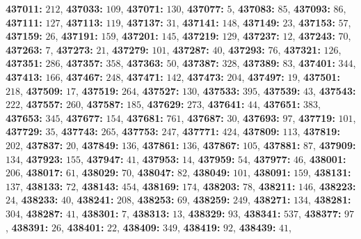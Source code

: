 \textsf{\bfseries 437011:} $212$, \textsf{\bfseries 437033:} $109$, \textsf{\bfseries 437071:} $130$, \textsf{\bfseries 437077:} $5$, \textsf{\bfseries 437083:} $85$, \textsf{\bfseries 437093:} $86$, \textsf{\bfseries 437111:} $127$, \textsf{\bfseries 437113:} $119$, \textsf{\bfseries 437137:} $31$, \textsf{\bfseries 437141:} $148$, \textsf{\bfseries 437149:} $23$, \textsf{\bfseries 437153:} $57$, \textsf{\bfseries 437159:} $26$, \textsf{\bfseries 437191:} $159$, \textsf{\bfseries 437201:} $145$, \textsf{\bfseries 437219:} $129$, \textsf{\bfseries 437237:} $12$, \textsf{\bfseries 437243:} $70$, \textsf{\bfseries 437263:} $7$, \textsf{\bfseries 437273:} $21$, \textsf{\bfseries 437279:} $101$, \textsf{\bfseries 437287:} $40$, \textsf{\bfseries 437293:} $76$, \textsf{\bfseries 437321:} $126$, \textsf{\bfseries 437351:} $286$, \textsf{\bfseries 437357:} $358$, \textsf{\bfseries 437363:} $50$, \textsf{\bfseries 437387:} $328$, \textsf{\bfseries 437389:} $83$, \textsf{\bfseries 437401:} $344$, \textsf{\bfseries 437413:} $166$, \textsf{\bfseries 437467:} $248$, \textsf{\bfseries 437471:} $142$, \textsf{\bfseries 437473:} $204$, \textsf{\bfseries 437497:} $19$, \textsf{\bfseries 437501:} $218$, \textsf{\bfseries 437509:} $17$, \textsf{\bfseries 437519:} $264$, \textsf{\bfseries 437527:} $130$, \textsf{\bfseries 437533:} $395$, \textsf{\bfseries 437539:} $43$, \textsf{\bfseries 437543:} $222$, \textsf{\bfseries 437557:} $260$, \textsf{\bfseries 437587:} $185$, \textsf{\bfseries 437629:} $273$, \textsf{\bfseries 437641:} $44$, \textsf{\bfseries 437651:} $383$, \textsf{\bfseries 437653:} $345$, \textsf{\bfseries 437677:} $154$, \textsf{\bfseries 437681:} $761$, \textsf{\bfseries 437687:} $30$, \textsf{\bfseries 437693:} $97$, \textsf{\bfseries 437719:} $101$, \textsf{\bfseries 437729:} $35$, \textsf{\bfseries 437743:} $265$, \textsf{\bfseries 437753:} $247$, \textsf{\bfseries 437771:} $424$, \textsf{\bfseries 437809:} $113$, \textsf{\bfseries 437819:} $202$, \textsf{\bfseries 437837:} $20$, \textsf{\bfseries 437849:} $136$, \textsf{\bfseries 437861:} $136$, \textsf{\bfseries 437867:} $105$, \textsf{\bfseries 437881:} $87$, \textsf{\bfseries 437909:} $134$, \textsf{\bfseries 437923:} $155$, \textsf{\bfseries 437947:} $41$, \textsf{\bfseries 437953:} $14$, \textsf{\bfseries 437959:} $54$, \textsf{\bfseries 437977:} $46$, \textsf{\bfseries 438001:} $206$, \textsf{\bfseries 438017:} $61$, \textsf{\bfseries 438029:} $70$, \textsf{\bfseries 438047:} $82$, \textsf{\bfseries 438049:} $101$, \textsf{\bfseries 438091:} $159$, \textsf{\bfseries 438131:} $137$, \textsf{\bfseries 438133:} $72$, \textsf{\bfseries 438143:} $454$, \textsf{\bfseries 438169:} $174$, \textsf{\bfseries 438203:} $78$, \textsf{\bfseries 438211:} $146$, \textsf{\bfseries 438223:} $24$, \textsf{\bfseries 438233:} $40$, \textsf{\bfseries 438241:} $208$, \textsf{\bfseries 438253:} $69$, \textsf{\bfseries 438259:} $249$, \textsf{\bfseries 438271:} $134$, \textsf{\bfseries 438281:} $304$, \textsf{\bfseries 438287:} $41$, \textsf{\bfseries 438301:} $7$, \textsf{\bfseries 438313:} $13$, \textsf{\bfseries 438329:} $93$, \textsf{\bfseries 438341:} $537$, \textsf{\bfseries 438377:} $97$, \textsf{\bfseries 438391:} $26$, \textsf{\bfseries 438401:} $22$, \textsf{\bfseries 438409:} $349$, \textsf{\bfseries 438419:} $92$, \textsf{\bfseries 438439:} $41$, 
